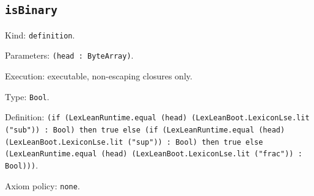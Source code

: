 \documentclass[11pt]{article}
\begin{document}
\subsection*{\texttt{isBinary}}
\noindent Kind: \texttt{definition}.\par
\noindent Parameters: \texttt{(head : ByteArray)}.\par
\noindent Execution: executable, non-escaping closures only.\par
\noindent Type: \texttt{Bool}.\par
\noindent Definition: \texttt{(if (LexLeanRuntime.equal (head) (LexLeanBoot.LexiconLse.lit ("sub")) : Bool) then true else (if (LexLeanRuntime.equal (head) (LexLeanBoot.LexiconLse.lit ("sup")) : Bool) then true else (LexLeanRuntime.equal (head) (LexLeanBoot.LexiconLse.lit ("frac")) : Bool)))}.\par
\noindent Axiom policy: \texttt{none}.\par
\end{document}
